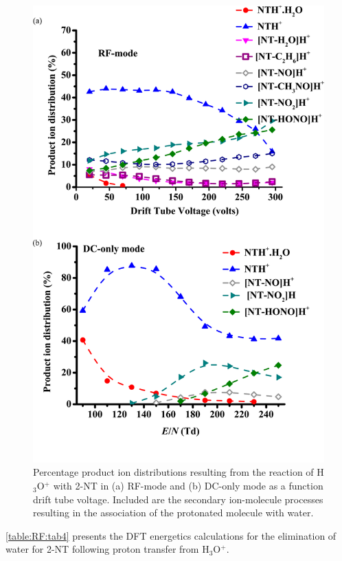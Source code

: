 \begin{figure}%
\centering
\includegraphics[height=0.7\textheight]{pics/RFpaper_fig9.png}
\caption{Percentage product ion distributions resulting from the reaction of H$_3$O$^+$ with 2-NT in (a) RF-mode and (b) DC-only mode as a function drift tube voltage. Included are the secondary ion-molecule processes resulting in the association of the protonated molecule with water.}
\label{fig:RF9}
\end{figure}

\autoref{table:RF:tab4} presents the DFT energetics calculations for the elimination of water for 2-NT following proton transfer from H$_3$O$^+$.


